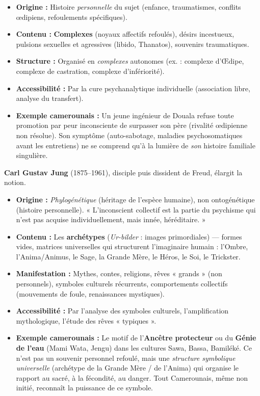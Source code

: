 \documentclass[11pt]{article}
\begin{document}
\begin{propriete}
\begin{itemize}
    \item \textbf{Origine :} Histoire \emph{personnelle} du sujet (enfance, traumatismes, conflits œdipiens, refoulements spécifiques).
    \item \textbf{Contenu :} \textbf{Complexes} (noyaux affectifs refoulés), désirs incestueux, pulsions sexuelles et agressives (libido, Thanatos), souvenirs traumatiques.
    \item \textbf{Structure :} Organisé en \emph{complexes} autonomes (ex. : complexe d'Œdipe, complexe de castration, complexe d'infériorité).
    \item \textbf{Accessibilité :} Par la cure psychanalytique individuelle (association libre, analyse du transfert).
    \item \textbf{Exemple camerounais :} Un jeune ingénieur de Douala refuse toute promotion par peur inconsciente de surpasser son père (rivalité œdipienne non résolue). Son symptôme (auto-sabotage, maladies psychosomatiques avant les entretiens) ne se comprend qu'à la lumière de \emph{son} histoire familiale singulière.
\end{itemize}
\end{propriete}

\begin{propriete}
\textbf{Carl Gustav Jung} (1875–1961), disciple puis dissident de Freud, élargit la notion.
\begin{itemize}
    \item \textbf{Origine :} \emph{Phylogénétique} (héritage de l'espèce humaine), non ontogénétique (histoire personnelle). « L'inconscient collectif est la partie du psychisme qui n'est pas acquise individuellement, mais innée, héréditaire. »
    \item \textbf{Contenu :} Les \textbf{archétypes} (\emph{Ur-bilder} : images primordiales) — formes vides, matrices universelles qui structurent l'imaginaire humain : l'Ombre, l'Anima/Animus, le Sage, la Grande Mère, le Héros, le Soi, le Trickster.
    \item \textbf{Manifestation :} Mythes, contes, religions, rêves « grands » (non personnels), symboles culturels récurrents, comportements collectifs (mouvements de foule, renaissances mystiques).
    \item \textbf{Accessibilité :} Par l'analyse des symboles culturels, l'amplification mythologique, l'étude des rêves « typiques ».
    \item \textbf{Exemple camerounais :} Le motif de l'\textbf{Ancêtre protecteur} ou du \textbf{Génie de l'eau} (Mami Wata, Jengu) dans les cultures Sawa, Bassa, Bamiléké. Ce n'est pas un souvenir personnel refoulé, mais une \emph{structure symbolique universelle} (archétype de la Grande Mère / de l'Anima) qui organise le rapport au sacré, à la fécondité, au danger. Tout Camerounais, même non initié, reconnaît la puissance de ce symbole.
\end{itemize}
\end{propriete}
\end{document}
